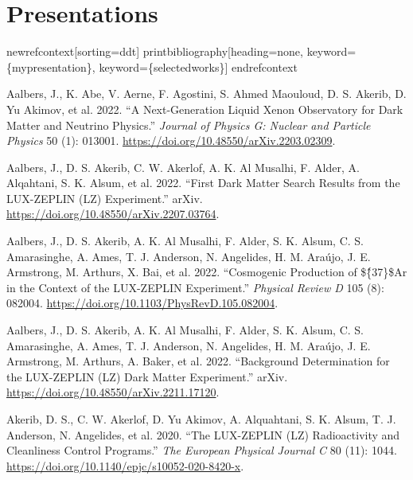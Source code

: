 \documentclass[
  10pt,
  letterpaper,
  DIV=11,
  numbers=noendperiod]{scrartcl}
\newlength{\cslhangindent}
\newlength{\cslentryspacingunit} %
\newenvironment{CSLReferences}[2] %
 {%
  \setlength{\parindent}{0pt}
  \ifodd #1
  \let\oldpar\par
  \def\par{\hangindent=\cslhangindent\oldpar}
  \fi
  \setlength{\parskip}{#2\cslentryspacingunit}
 }%
 {}
\begin{document}
\hypertarget{fa-chart-bar-presentations}{%
\section{\texorpdfstring{
Presentations}{ Presentations}}\label{fa-chart-bar-presentations}}

newrefcontext{[}sorting=ddt{]} printbibliography{[}heading=none,
keyword=\{mypresentation\}, keyword=\{selectedworks\}{]} endrefcontext

\hypertarget{refs}{}
\begin{CSLReferences}{1}{0}
\leavevmode{}%
Aalbers, J., K. Abe, V. Aerne, F. Agostini, S. Ahmed Maouloud, D. S.
Akerib, D. Yu Akimov, et al. 2022. {``A {Next-Generation Liquid Xenon
Observatory} for {Dark Matter} and {Neutrino Physics}.''} \emph{Journal
of Physics G: Nuclear and Particle Physics} 50 (1): 013001.
\url{https://doi.org/10.48550/arXiv.2203.02309}.

\leavevmode{}%
Aalbers, J., D. S. Akerib, C. W. Akerlof, A. K. Al Musalhi, F. Alder, A.
Alqahtani, S. K. Alsum, et al. 2022. {``First {Dark Matter Search
Results} from the {LUX-ZEPLIN} ({LZ}) {Experiment}.''} {arXiv}.
\url{https://doi.org/10.48550/arXiv.2207.03764}.

\leavevmode{}%
Aalbers, J., D. S. Akerib, A. K. Al Musalhi, F. Alder, S. K. Alsum, C.
S. Amarasinghe, A. Ames, T. J. Anderson, N. Angelides, H. M. Araújo, J.
E. Armstrong, M. Arthurs, X. Bai, et al. 2022. {``Cosmogenic Production
of \$\{̂37\}\${Ar} in the Context of the {LUX-ZEPLIN} Experiment.''}
\emph{Physical Review D} 105 (8): 082004.
\url{https://doi.org/10.1103/PhysRevD.105.082004}.

\leavevmode{}%
Aalbers, J., D. S. Akerib, A. K. Al Musalhi, F. Alder, S. K. Alsum, C.
S. Amarasinghe, A. Ames, T. J. Anderson, N. Angelides, H. M. Araújo, J.
E. Armstrong, M. Arthurs, A. Baker, et al. 2022. {``Background
{Determination} for the {LUX-ZEPLIN} ({LZ}) {Dark Matter Experiment}.''}
{arXiv}. \url{https://doi.org/10.48550/arXiv.2211.17120}.

\leavevmode{}%
Akerib, D. S., C. W. Akerlof, D. Yu Akimov, A. Alquahtani, S. K. Alsum,
T. J. Anderson, N. Angelides, et al. 2020. {``The {LUX-ZEPLIN} ({LZ})
Radioactivity and Cleanliness Control Programs.''} \emph{The European
Physical Journal C} 80 (11): 1044.
\url{https://doi.org/10.1140/epjc/s10052-020-8420-x}.


\end{CSLReferences}
\end{document}
